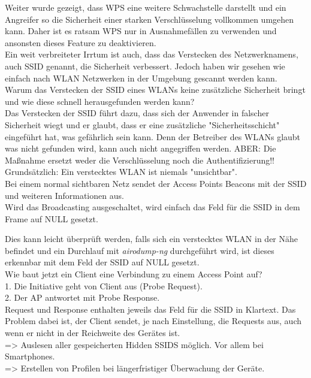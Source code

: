 Weiter wurde gezeigt, dass WPS eine weitere Schwachstelle darstellt und ein Angreifer so die Sicherheit einer starken Verschlüsselung vollkommen umgehen kann. Daher ist es ratsam WPS nur in Ausnahmefällen zu verwenden und ansonsten dieses Feature zu deaktivieren. \\

Ein weit verbreiteter Irrtum ist auch, dass das Verstecken des Netzwerknamens, auch SSID genannt, die Sicherheit verbessert. Jedoch haben wir gesehen wie einfach nach WLAN Netzwerken in der Umgebung gescannt werden kann.\\

Warum das Verstecken der SSID eines WLANs keine zusätzliche Sicherheit bringt und wie diese schnell herausgefunden werden kann?\\
	
Das Verstecken der SSID führt dazu, dass sich der Anwender in falscher Sicherheit wiegt und er glaubt, dass er eine zusätzliche "Sicherheitsschicht" eingeführt hat, was gefährlich sein kann.
Denn der Betreiber des WLANs glaubt was nicht gefunden wird, kann auch nicht angegriffen werden.
ABER: Die Maßnahme ersetzt weder die Verschlüsselung noch die Authentifizierung!!\\

Grundsätzlich: Ein verstecktes WLAN ist niemals "unsichtbar".\\

Bei einem normal sichtbaren Netz sendet der Access Points Beacons mit der SSID und weiteren Informationen
aus. \\

Wird das Broadcasting ausgeschaltet, wird einfach das Feld für die SSID in dem Frame auf NULL gesetzt. 

Dies kann leicht überprüft werden, falls sich ein verstecktes WLAN in der Nähe befindet und ein Durchlauf mit \textit{airodump-ng} durchgeführt wird, ist dieses erkennbar mit dem Feld der SSID auf NULL gesetzt.\\

Wie baut jetzt ein Client eine Verbindung zu einem Access Point auf?\\

1. Die Initiative geht von Client aus (Probe Request).\\
2. Der AP antwortet mit Probe Response.\\
  
Request und Response enthalten jeweils das Feld für die SSID in Klartext.
Das Problem dabei ist, der Client sendet, je nach Einstellung, die Requests aus, auch wenn er nicht in der Reichweite des Gerätes ist. \\
	=> Auslesen aller gespeicherten Hidden SSIDS möglich. Vor allem bei Smartphones.\\
	=> Erstellen von Profilen bei längerfristiger Überwachung der Geräte.\\
	
